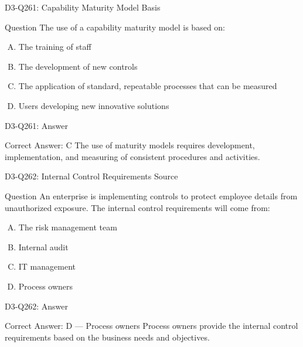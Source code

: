 \documentclass{beamer}
\begin{document}
	\begin{frame}{D3-Q261: Capability Maturity Model Basis}
		\begin{block}{Question}
			The use of a capability maturity model is based on:
		\end{block}
		\begin{enumerate}[(A)]
			\item The training of staff
			\item The development of new controls
			\item The application of standard, repeatable processes that can be measured
			\item Users developing new innovative solutions
		\end{enumerate}
	\end{frame}
	\begin{frame}{D3-Q261: Answer}
		\begin{block}{Correct Answer: C}
			The use of maturity models requires development, implementation, and measuring of consistent procedures and activities.
		\end{block}
	\end{frame}
	
	\begin{frame}{D3-Q262: Internal Control Requirements Source}
		\begin{block}{Question}
			An enterprise is implementing controls to protect employee details from unauthorized exposure. The internal control requirements will come from:
		\end{block}
		\begin{enumerate}[(A)]
			\item The risk management team
			\item Internal audit
			\item IT management
			\item Process owners
		\end{enumerate}
	\end{frame}
	\begin{frame}{D3-Q262: Answer}
		\begin{block}{Correct Answer: D --- Process owners}
			Process owners provide the internal control requirements based on the business needs and objectives.
		\end{block}
	\end{frame}
	
\end{document}
